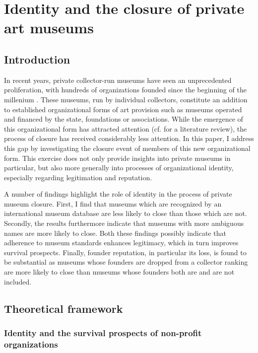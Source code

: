 \documentclass[12pt]{article}
\author{Johannes }
\date{\today}
\title{}
\begin{document}
\section*{Identity and the closure of private art museums}



\subsection*{Introduction}


In recent years, private collector-run museums have seen an unprecedented proliferation, with hundreds of organizations founded since the beginning of the millenium \parencite{Velthuis_etal_2023_boom,LarrysList_2015_report}.
These museums, run by individual collectors, constitute an addition to established organizational forms of art provision such as museums operated and financed by the state, foundations or associations.
While the emergence of this organizational form has attracted attention (cf. \cite{Kolbe_etal_2022_privatemuseum} for a literature review), the process of closure has received considerably less attention.
In this paper, I address this gap by investigating the closure event of members of this new organizational form.
This exercise does not only provide insights into private museums in particular, but also more generally into processes of organizational identity, especially regarding legitimation and reputation. 


A number of findings highlight the role of identity in the process of private museum closure. 
First, I find that museums which are recognized by an international museum database are less likely to close than those which are not.
Secondly, the results furthermore indicate that museums with more ambiguous names are more likely to close.
Both these findings possibly indicate that adherence to museum standards enhances legitimacy, which in turn improves survival prospects.
Finally, founder reputation, in particular its loss, is found to be substantial as museums whose founders are dropped from a collector ranking are more likely to close than museums whose founders both are and are not included.




\subsection*{Theoretical framework}



\subsubsection*{Identity and the survival prospects of non-profit organizations}
\end{document}
